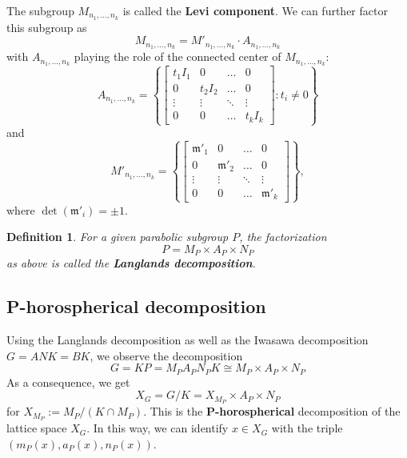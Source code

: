 \documentclass[12pt]{article} %
\newtheorem{definition}{Definition}[section]
\begin{document}
The subgroup $M_{n_1,\ldots, n_k}$ is called the \textbf{Levi component}. We can further factor this subgroup as
\[M_{n_1,\ldots, n_k} = M'_{n_1,\ldots, n_k} \cdot A_{n_1,\ldots, n_k}\]
with $A_{n_1,\ldots, n_k}$ playing the role of the connected center of $M_{n_1,\ldots, n_k}$:
\[A_{n_1,\ldots, n_k} = \left\lbrace \begin{bmatrix}
        t_1I_1 & 0      & \ldots & 0      \\
        0      & t_2I_2 & \ldots & 0      \\
        \vdots & \vdots & \ddots & \vdots \\
        0      & 0      & \ldots & t_kI_k
    \end{bmatrix} : t_i \ne 0\right\rbrace \]
and
\[M'_{n_1,\ldots, n_k} = \left\lbrace \begin{bmatrix}
        \mathfrak{m}'_1 & 0               & \ldots & 0               \\
        0               & \mathfrak{m}'_2 & \ldots & 0               \\
        \vdots          & \vdots          & \ddots & \vdots          \\
        0               & 0               & \ldots & \mathfrak{m}'_k
    \end{bmatrix} \right\rbrace,\]
where $\det(\mathfrak{m}'_i) = \pm 1$.
\begin{definition}
    For a given parabolic subgroup $P$, the factorization
    \[P = M_P \times A_P \times N_P\]
    as above is called the \textbf{Langlands decomposition}.
\end{definition}
\subsection{P-horospherical decomposition}
Using the Langlands decomposition as well as the Iwasawa decomposition $G= ANK = BK$, we observe
the decomposition
\[G = KP = M_PA_PN_PK \cong M_P \times A_P \times N_P\]
As a consequence, we get
\[X_G  = G/K = X_{M_P} \times A_P \times N_P\]
for $X_{M_P} := M_{P}/(K\cap M_P)$. This is the \textbf{P-horospherical} decomposition of the lattice space $X_G$. In this way,
we can identify  $x \in X_G$ with the triple $(m_P(x), a_P(x),n_P(x))$.
\end{document}
